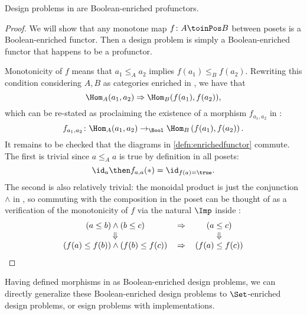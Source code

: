 \begin{proposition}
Design problems in \DP are Boolean-enriched profunctors.
\end{proposition}
\begin{proof}
We will show that any monotone map $f\colon A \toinPos B$ between posets is a Boolean-enriched functor. Then a design problem is simply a Boolean-enriched functor that happens to be a profunctor.

Monotonicity of $f$ means that $a_1 \leq_A a_2$ implies $f(a_1) \leq_B f(a_2)$. Rewriting this condition considering $A, B$ as categories enriched in \Bool, we have that
\begin{equation}
\Hom_A(a_1, a_2) \Rightarrow \Hom_B(f(a_1), f(a_2)),
\end{equation}
which can be re-stated as proclaiming the existence of a morphism $f_{a_1, a_2}$ in \Bool:
\begin{equation}
f_{a_1, a_2} \colon \Hom_A(a_1, a_2) \to_{\Bool} \Hom_B\left(f(a_1), f(a_2)\right) .
\end{equation}
It remains to be checked that the diagrams in \cref{defn:enrichedfunctor} commute. The first is trivial since $a \leq_A a$ is true by definition in all posets:
\begin{equation}
\id_{a} \then f_{a,a} (\ast) = \id_{f(a) = \true}.
\end{equation}
The second is also relatively trivial: the monoidal product is just the conjunction $\wedge$ in \Bool, so commuting with the composition in the poset can be thought of as a verification of the monotonicity of $f$ via the natural $\Imp$ inside \Bool:
\begin{equation}
\begin{tabular}{ccc}
$(a \leq b) \wedge (b \leq c)$             & $\Rightarrow$ & $(a \leq c)$       \\
$\Downarrow$                               &               & $\Downarrow$       \\
$(f(a) \leq f(b)) \wedge (f(b) \leq f(c))$ & $\Rightarrow$ & $(f(a) \leq f(c))$
\end{tabular}
\end{equation}
\end{proof}

Having defined morphisms in \DP as Boolean-enriched design problems, we can directly generalize these Boolean-enriched design problems to $\Set$-enriched design problems, or esign problems with implementations.

